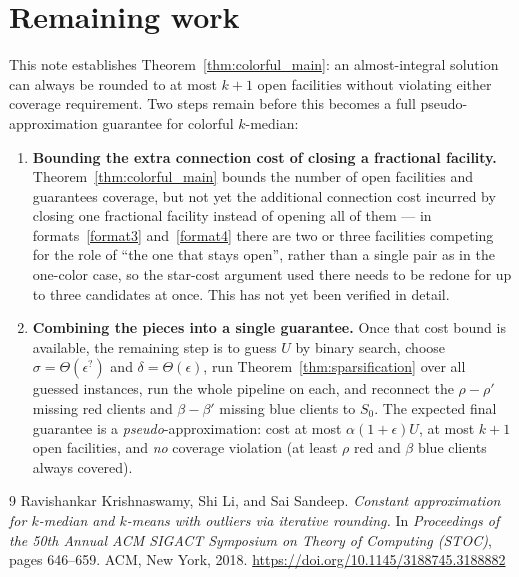 \documentclass[a4paper,11pt]{article}
\newcommand{\eps}{\epsilon}
\begin{document}
\section{Remaining work}
\label{sec:status}

This note establishes Theorem~\ref{thm:colorful_main}: an almost-integral
solution can always be rounded to at most $k+1$ open facilities without
violating either coverage requirement. Two steps remain before this
becomes a full pseudo-approximation guarantee for colorful $k$-median:

\begin{enumerate}
\item \textbf{Bounding the extra connection cost of closing a fractional
facility.} Theorem~\ref{thm:colorful_main} bounds the number of open
facilities and guarantees coverage, but not yet the additional connection
cost incurred by closing one fractional facility instead of opening all
of them — in formats~\ref{format3} and~\ref{format4} there are two or
three facilities competing for the role of ``the one that stays open'',
rather than a single pair as in the one-color case, so the star-cost
argument used there needs to be redone for up to three candidates at
once. This has not yet been verified in detail.
\item \textbf{Combining the pieces into a single guarantee.} Once that
cost bound is available, the remaining step is to guess $U$ by binary
search, choose $\sigma=\Theta(\eps^{?})$ and $\delta=\Theta(\eps)$, run
Theorem~\ref{thm:sparsification} over all guessed instances, run the
whole pipeline on each, and reconnect the $\rho-\rho'$ missing red
clients and $\beta-\beta'$ missing blue clients to $S_0$. The expected
final guarantee is a \emph{pseudo}-approximation: cost at most
$\alpha(1+\eps)U$, at most $k+1$ open facilities, and \emph{no} coverage
violation (at least $\rho$ red and $\beta$ blue clients always covered).
\end{enumerate}

\begin{thebibliography}{9}
Ravishankar Krishnaswamy, Shi Li, and Sai Sandeep.
\emph{Constant approximation for $k$-median and $k$-means with outliers
via iterative rounding.}
In \emph{Proceedings of the 50th Annual ACM SIGACT Symposium on Theory of
Computing (STOC)}, pages 646--659. ACM, New York, 2018.
\url{https://doi.org/10.1145/3188745.3188882}
\end{thebibliography}
\end{document}
